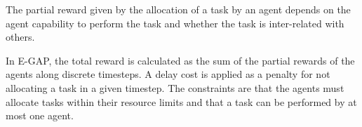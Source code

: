 
The partial reward given by the allocation of a task by an agent depends on the agent capability to perform the task and whether the task is inter-related with others. 





In E-GAP, the total reward is calculated as the sum of the partial rewards of the agents along discrete timesteps. A delay cost is applied as a penalty for not allocating a task in a given timestep. The constraints are that the agents must allocate tasks within their resource limits and that a task can be performed by at most one agent.


